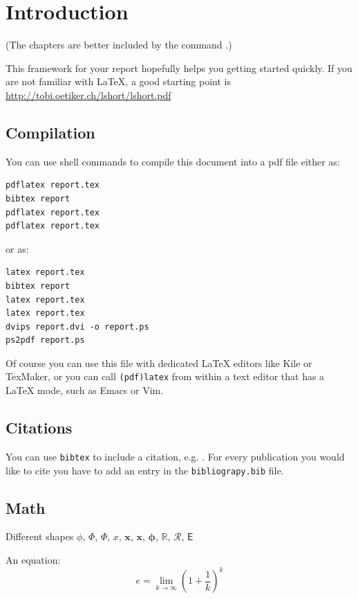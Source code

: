 \documentclass[11pt,a4paper,twoside]{report}
\begin{document}
\setcounter{chapter}{0}
\setcounter{figure}{0}
\fancyhead[LO]{\rightmark}
\fancyhead[RO]{\scshape \chaptername\ \thechapter}
\fancyhead[LE]{\scshape \chaptername\ \thechapter}
\fancyhead[RE]{\textsc{\leftmark}}

\chapter{Introduction}
(The chapters are better included by the command \verb||.)

This framework for your report hopefully helps you getting started quickly.  If
you are not familiar with \LaTeX{}, a good starting point is
\url{http://tobi.oetiker.ch/lshort/lshort.pdf}

\section{Compilation}
You can use shell commands to compile this document into a pdf file either as:
\begin{verbatim}
pdflatex report.tex
bibtex report
pdflatex report.tex
pdflatex report.tex
\end{verbatim}
or as:
\begin{verbatim}
latex report.tex
bibtex report
latex report.tex
latex report.tex
dvips report.dvi -o report.ps
ps2pdf report.ps
\end{verbatim}

Of course you can use this file with dedicated \LaTeX{} editors like Kile or
TexMaker, or you can call \texttt{(pdf)latex} from within a text editor that has
a \LaTeX{} mode, such as Emacs or Vim.

\section{Citations}

You can use \verb|bibtex| to include a citation, e.g. \cite{loeliger2007}.  For
every publication you would like to cite you have to add an entry in the
\verb|bibliograpy.bib| file.

\section{Math}
Different shapes $\phi$, $\Phi$, $\varPhi$, $x$, $\mathbf{x}$, $\boldsymbol{x}$,
$\boldsymbol{\phi}$, $\mathbb{R}$, $\mathcal{R}$, $\mathsf{E}$

An equation:
\begin{equation*}
  e = \lim_{k\to\infty} \left( 1 + \frac{1}{k} \right)^k
\end{equation*}
\end{document}
